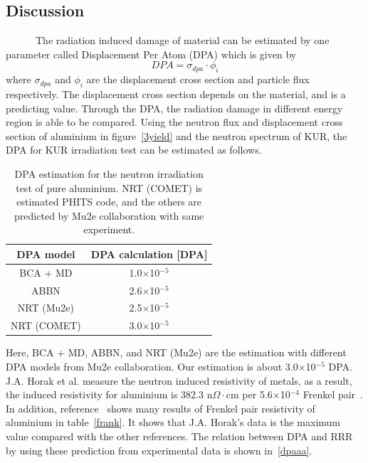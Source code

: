  \subsection{Discussion}
~~~~~~The radiation induced damage of material can be estimated by one parameter called Displacement Per Atom (DPA) which is given by
\begin{equation}
 DPA = \sigma_{dpa} \cdot \phi_i
\end{equation}
where $\sigma_{dpa}$ and $\phi_i$ are the displacement cross section and particle flux respectively.
The displacement cross section depends on the material, and is a predicting value.
Through the DPA, the radiation damage in different energy region is able to be compared.
Using the neutron flux and displacement cross section of aluminium in figure~\ref{3yield} and the neutron spectrum of KUR, the DPA for KUR irradiation test can be estimated as follows.
\begin{table}[H]
 \centering
 \begin{tabular}{cc} \hline \hline
  DPA model & DPA calculation [DPA] \\ \hline
  BCA + MD & 1.0$\times$10$^{-5}$ \\
  ABBN & 2.6$\times$10$^{-5}$ \\
  NRT (Mu2e) & 2.5$\times$10$^{-5}$ \\
  NRT (COMET) & 3.0$\times$10$^{-5}$ \\ \hline \hline
 \end{tabular}
 \caption{DPA estimation for the neutron irradiation test of pure aluminium. NRT (COMET) is estimated PHITS code, and the others are predicted by Mu2e collaboration with same experiment.}
\end{table}
Here, BCA + MD, ABBN, and NRT (Mu2e) are the estimation with different DPA models from Mu2e collaboration.
Our estimation is about 3.0$\times$10$^{-5}$ DPA.
J.A. Horak et al. measure the neutron induced resistivity of metals, as a result, the induced resistivity for aluminium is 382.3 n$\Omega\cdot$cm per 5.6$\times$10$^{-4}$ Frenkel pair~\cite{horak}.
In addition, reference~\cite{yu} shows many results of Frenkel pair resistivity of aluminium in table~\ref{frank}.
It shows that J.A. Horak's data is the maximum value compared with the other references.
The relation between DPA and RRR by using these prediction from experimental data is shown in~\ref{dpaaa}.

